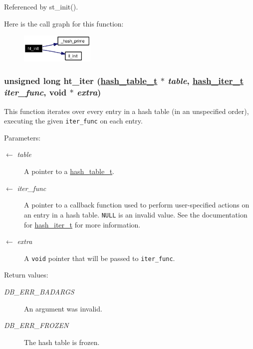 Referenced by st\_\-init().

Here is the call graph for this function:\begin{figure}[H]
\begin{center}
\leavevmode
\includegraphics[width=100pt]{group__dbprim__hash_ga10_cgraph}
\end{center}
\end{figure}
\hypertarget{group__dbprim__hash_ga15}{
\subsubsection[ht\_\-iter]{\setlength{\rightskip}{0pt plus 5cm}unsigned long ht\_\-iter (\hyperlink{struct__hash__table__s}{hash\_\-table\_\-t} $\ast$ {\em table}, \hyperlink{group__dbprim__hash_ga3}{hash\_\-iter\_\-t} {\em iter\_\-func}, void $\ast$ {\em extra})}}
\label{group__dbprim__hash_ga15}


This function iterates over every entry in a hash table (in an unspecified order), executing the given {\tt iter\_\-func} on each entry.

\begin{Desc}
\item[Parameters:]
\begin{description}
\item[\mbox{$\leftarrow$} {\em table}]A pointer to a \hyperlink{group__dbprim__hash_ga1}{hash\_\-table\_\-t}. \item[\mbox{$\leftarrow$} {\em iter\_\-func}]A pointer to a callback function used to perform user-specified actions on an entry in a hash table. {\tt NULL} is an invalid value. See the documentation for \hyperlink{group__dbprim__hash_ga3}{hash\_\-iter\_\-t} for more information. \item[\mbox{$\leftarrow$} {\em extra}]A {\tt void} pointer that will be passed to {\tt iter\_\-func}.\end{description}
\end{Desc}
\begin{Desc}
\item[Return values:]
\begin{description}
\item[{\em DB\_\-ERR\_\-BADARGS}]An argument was invalid. \item[{\em DB\_\-ERR\_\-FROZEN}]The hash table is frozen.\end{description}
\end{Desc}


